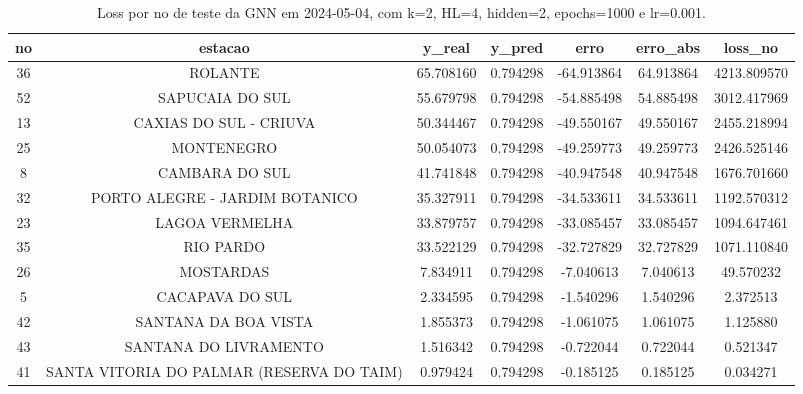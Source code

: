 \begin{table}[h]
\centering
\caption{Loss por no de teste da GNN em 2024-05-04, com k=2, HL=4, hidden=2, epochs=1000 e lr=0.001.}
\label{tab:gnn_loss_k2_hl4_h2_e1000_d20240504}
\begin{tabular}{ccccccc}
\toprule
no & estacao & y\_real & y\_pred & erro & erro\_abs & loss\_no \\
\midrule
36 & ROLANTE & 65.708160 & 0.794298 & -64.913864 & 64.913864 & 4213.809570 \\
52 & SAPUCAIA DO SUL & 55.679798 & 0.794298 & -54.885498 & 54.885498 & 3012.417969 \\
13 & CAXIAS DO SUL - CRIUVA & 50.344467 & 0.794298 & -49.550167 & 49.550167 & 2455.218994 \\
25 & MONTENEGRO & 50.054073 & 0.794298 & -49.259773 & 49.259773 & 2426.525146 \\
8 & CAMBARA DO SUL & 41.741848 & 0.794298 & -40.947548 & 40.947548 & 1676.701660 \\
32 & PORTO ALEGRE - JARDIM BOTANICO & 35.327911 & 0.794298 & -34.533611 & 34.533611 & 1192.570312 \\
23 & LAGOA VERMELHA & 33.879757 & 0.794298 & -33.085457 & 33.085457 & 1094.647461 \\
35 & RIO PARDO & 33.522129 & 0.794298 & -32.727829 & 32.727829 & 1071.110840 \\
26 & MOSTARDAS & 7.834911 & 0.794298 & -7.040613 & 7.040613 & 49.570232 \\
5 & CACAPAVA DO SUL & 2.334595 & 0.794298 & -1.540296 & 1.540296 & 2.372513 \\
42 & SANTANA DA BOA VISTA & 1.855373 & 0.794298 & -1.061075 & 1.061075 & 1.125880 \\
43 & SANTANA DO LIVRAMENTO & 1.516342 & 0.794298 & -0.722044 & 0.722044 & 0.521347 \\
41 & SANTA VITORIA DO PALMAR (RESERVA DO TAIM) & 0.979424 & 0.794298 & -0.185125 & 0.185125 & 0.034271 \\
\bottomrule
\end{tabular}
\end{table}
